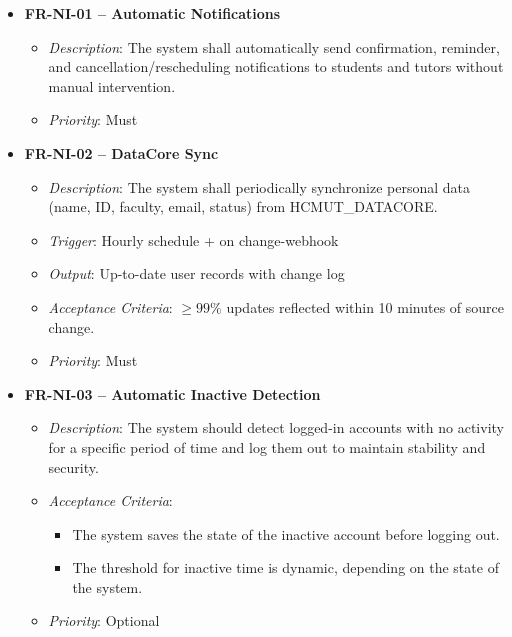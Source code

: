 \begin{itemize}
    \item \textbf{FR-NI-01 – Automatic Notifications}
        \begin{itemize}
            \item \textit{Description}: The system shall automatically send confirmation, reminder, and cancellation/rescheduling notifications to students and tutors without manual intervention.
            \item \textit{Priority}: Must
        \end{itemize}

    \item \textbf{FR-NI-02 – DataCore Sync}
        \begin{itemize}
            \item \textit{Description}: The system shall periodically synchronize personal data (name, ID, faculty, email, status) from HCMUT\_DATACORE.
            \item \textit{Trigger}: Hourly schedule + on change-webhook
            \item \textit{Output}: Up-to-date user records with change log
            \item \textit{Acceptance Criteria}: \(\geq 99\%\) updates reflected within 10 minutes of source change. 
            \item \textit{Priority}: Must
        \end{itemize}

    \item \textbf{FR-NI-03 – Automatic Inactive Detection}
        \begin{itemize}
            \item \textit{Description}: The system should detect logged-in accounts with no activity for a specific period of time and log them out to maintain stability and security.
            \item \textit{Acceptance Criteria}: 
                \begin{itemize}
                    \item The system saves the state of the inactive account before logging out.
                    \item The threshold for inactive time is dynamic, depending on the state of the system.
                \end{itemize}
            \item \textit{Priority}: Optional
        \end{itemize}


\end{itemize}
